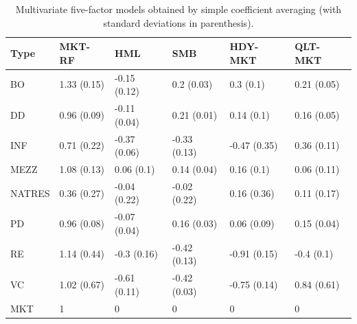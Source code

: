 \documentclass[12pt]{article}
\begin{document}
\begin{table}[ht]
	\centering
	\begin{tabular}{l@{\hskip 0.3in}l@{\hskip 0.2in}l@{\hskip 0.2in}l@{\hskip 0.2in}l@{\hskip 0.2in}l@{\hskip 0.1in}}
		Type & MKT-RF & HML & SMB & HDY-MKT & QLT-MKT \\ 
		\hline
		\hline
		BO & 1.33 (0.15) & -0.15 (0.12) & 0.2 (0.03) & 0.3 (0.1) & 0.21 (0.05) \\ 
		DD & 0.96 (0.09) & -0.11 (0.04) & 0.21 (0.01) & 0.14 (0.1) & 0.16 (0.05) \\ 
		INF & 0.71 (0.22) & -0.37 (0.06) & -0.33 (0.13) & -0.47 (0.35) & 0.36 (0.11) \\ 
		MEZZ & 1.08 (0.13) & 0.06 (0.1) & 0.14 (0.04) & 0.16 (0.1) & 0.06 (0.11) \\ 
		NATRES & 0.36 (0.27) & -0.04 (0.22) & -0.02 (0.22) & 0.16 (0.36) & 0.11 (0.17) \\ 
		PD & 0.96 (0.08) & -0.07 (0.04) & 0.16 (0.03) & 0.06 (0.09) & 0.15 (0.04) \\ 
		RE & 1.14 (0.44) & -0.3 (0.16) & -0.42 (0.13) & -0.91 (0.15) & -0.4 (0.1) \\ 
		VC & 1.02 (0.67) & -0.61 (0.11) & -0.42 (0.03) & -0.75 (0.14) & 0.84 (0.61) \\ 
		\hline
		MKT & 1 & 0 & 0 & 0 & 0 \\ 
		\hline
		\hline
	\end{tabular}
	\caption{
		Multivariate five-factor models obtained by simple coefficient averaging (with standard deviations in parenthesis).
	} 
	\label{tab:average_coefs}
\end{table}
\end{document}
